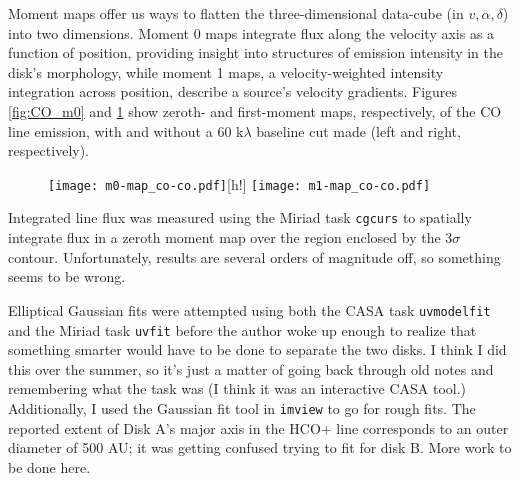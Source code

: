 Moment maps offer us ways to flatten the three-dimensional data-cube (in $v, \alpha, \delta$) into two dimensions. Moment 0 maps integrate flux along the velocity axis as a function of position, providing insight into structures of emission intensity in the disk's morphology, while moment 1 maps, a velocity-weighted intensity integration across position, describe a source's velocity gradients. Figures \ref{fig:CO_m0} and \ref{fig:CO_m1} show zeroth- and first-moment maps, respectively, of the CO line emission, with and without a 60 k$\lambda$ baseline cut made (left and right, respectively).

\begin{figure}
\centering
\texttt{[image: m0-map\_co-co.pdf]}[h!]
  \label{fig:CO_m0}
  \texttt{[image: m1-map\_co-co.pdf]}
  \label{fig:CO_m1}
\end{figure}



Integrated line flux was measured using the Miriad task \texttt{cgcurs} to spatially integrate flux in a zeroth moment map over the region enclosed by the 3$\sigma$ contour. Unfortunately, results are several orders of magnitude off, so something seems to be wrong.

Elliptical Gaussian fits were attempted using both the CASA task \texttt{uvmodelfit} and the Miriad task \texttt{uvfit} before the author woke up enough to realize that something smarter would have to be done to separate the two disks. I think I did this over the summer, so it's just a matter of going back through old notes and remembering what the task was (I think it was an interactive CASA tool.) Additionally, I used the Gaussian fit tool in \texttt{imview} to go for rough fits. The reported extent of Disk A's major axis in the HCO+ line corresponds to an outer diameter of 500 AU; it was getting confused trying to fit for disk B. More work to be done here.


